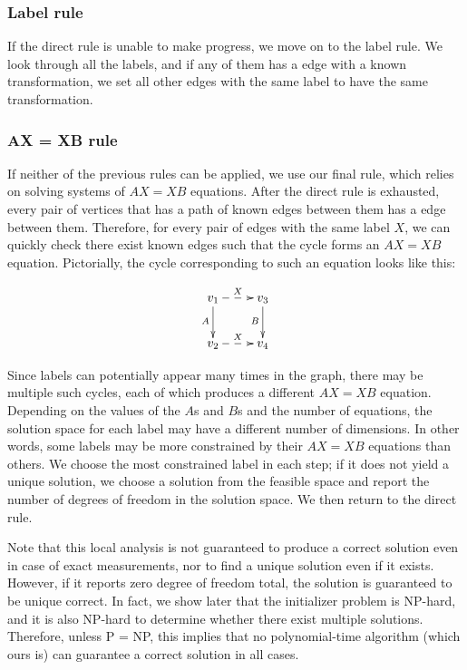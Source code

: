 \subsubsection{Label rule}

If the direct rule is unable to make progress, we move on to the label rule. We look through all the labels,
and if any of them has a edge with a known transformation, we set all other edges with the same label to
have the same transformation.

\subsubsection{AX = XB rule}

If neither of the previous rules can be applied, we use our final rule, which relies on solving 
systems of $AX = XB$ equations. After the direct rule is exhausted, every pair of vertices 
that has a path of known edges between them has a edge between them. 
Therefore, for every pair of edges with the same label $X$,
we can quickly check there exist known edges such that the cycle forms an $AX = XB$ equation.
Pictorially, the cycle corresponding to such an equation looks like this:

\begin{align}
	\xymatrix{
	v_1 \ar[d]_A \ar@{-->}[r]^{X} & v_3 \ar[d]_B \\
	v_2 \ar@{-->}[r]^{X}  & v_4 
	}
\end{align}

Since labels can potentially appear many times in the graph, there may be multiple such cycles,
each of which produces a different $AX = XB$ equation. Depending on the values of the $A$s and $B$s
and the number of equations, the solution space for each label may have a different number of dimensions.
In other words, some labels may be more constrained by their $AX = XB$ equations than others.
We choose the most constrained label in each step; if it does not yield a unique solution, we choose a
solution from the feasible space and report the number of degrees of freedom in the solution space.
We then return to the direct rule.

Note that this local analysis is not guaranteed to produce a correct solution even in case of exact 
measurements, 
nor to find a unique solution even if it exists. 
However, if it reports zero degree of freedom total, the solution is guaranteed to be unique correct.
In fact, we show later that the initializer problem is NP-hard, and it is also NP-hard to determine 
whether there exist multiple solutions. Therefore, unless P = NP, 
this implies that no polynomial-time algorithm
(which ours is) can guarantee a correct solution in all cases.

